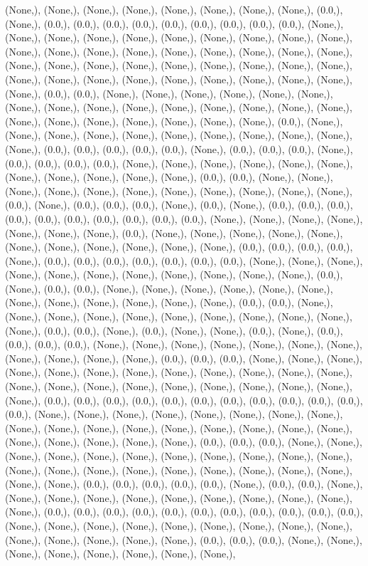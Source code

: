 \documentclass{article}
\begin{document}
(None,), (None,), (None,), (None,), (None,), (None,), (None,), (None,), (0.0,), (None,), (0.0,), (0.0,), (0.0,), (0.0,), (0.0,), (0.0,), (0.0,), (0.0,), (0.0,), (None,), (None,), (None,), (None,), (None,), (None,), (None,), (None,), (None,), (None,), (None,), (None,), (None,), (None,), (None,), (None,), (None,), (None,), (None,), (None,), (None,), (None,), (None,), (None,), (None,), (None,), (None,), (None,), (None,), (None,), (None,), (None,), (None,), (None,), (None,), (None,), (None,), (None,), (0.0,), (0.0,), (None,), (None,), (None,), (None,), (None,), (None,), (None,), (None,), (None,), (None,), (None,), (None,), (None,), (None,), (None,), (None,), (None,), (None,), (None,), (None,), (None,), (None,), (0.0,), (None,), (None,), (None,), (None,), (None,), (None,), (None,), (None,), (None,), (None,), (None,), (0.0,), (0.0,), (0.0,), (0.0,), (0.0,), (None,), (0.0,), (0.0,), (0.0,), (None,), (0.0,), (0.0,), (0.0,), (0.0,), (None,), (None,), (None,), (None,), (None,), (None,), (None,), (None,), (None,), (None,), (None,), (0.0,), (0.0,), (None,), (None,), (None,), (None,), (None,), (None,), (None,), (None,), (None,), (None,), (None,), (0.0,), (None,), (0.0,), (0.0,), (0.0,), (None,), (0.0,), (None,), (0.0,), (0.0,), (0.0,), (0.0,), (0.0,), (0.0,), (0.0,), (0.0,), (0.0,), (0.0,), (None,), (None,), (None,), (None,), (None,), (None,), (None,), (0.0,), (None,), (None,), (None,), (None,), (None,), (None,), (None,), (None,), (None,), (None,), (None,), (0.0,), (0.0,), (0.0,), (0.0,), (None,), (0.0,), (0.0,), (0.0,), (0.0,), (0.0,), (0.0,), (0.0,), (None,), (None,), (None,), (None,), (None,), (None,), (None,), (None,), (None,), (None,), (None,), (0.0,), (None,), (0.0,), (0.0,), (None,), (None,), (None,), (None,), (None,), (None,), (None,), (None,), (None,), (None,), (None,), (None,), (0.0,), (0.0,), (None,), (None,), (None,), (None,), (None,), (None,), (None,), (None,), (None,), (None,), (None,), (0.0,), (0.0,), (None,), (0.0,), (None,), (None,), (0.0,), (None,), (0.0,), (0.0,), (0.0,), (0.0,), (None,), (None,), (None,), (None,), (None,), (None,), (None,), (None,), (None,), (None,), (None,), (0.0,), (0.0,), (0.0,), (None,), (None,), (None,), (None,), (None,), (None,), (None,), (None,), (None,), (None,), (None,), (None,), (None,), (None,), (None,), (None,), (None,), (None,), (None,), (None,), (None,), (None,), (0.0,), (0.0,), (0.0,), (0.0,), (0.0,), (0.0,), (0.0,), (0.0,), (0.0,), (0.0,), (0.0,), (0.0,), (None,), (None,), (None,), (None,), (None,), (None,), (None,), (None,), (None,), (None,), (None,), (None,), (None,), (None,), (None,), (None,), (None,), (None,), (None,), (None,), (None,), (None,), (0.0,), (0.0,), (0.0,), (None,), (None,), (None,), (None,), (None,), (None,), (None,), (None,), (None,), (None,), (None,), (None,), (None,), (None,), (None,), (None,), (None,), (None,), (None,), (None,), (None,), (None,), (0.0,), (0.0,), (0.0,), (0.0,), (0.0,), (None,), (0.0,), (0.0,), (None,), (None,), (None,), (None,), (None,), (None,), (None,), (None,), (None,), (None,), (None,), (0.0,), (0.0,), (0.0,), (0.0,), (0.0,), (0.0,), (0.0,), (0.0,), (0.0,), (0.0,), (0.0,), (None,), (None,), (None,), (None,), (None,), (None,), (None,), (None,), (None,), (None,), (None,), (None,), (None,), (None,), (0.0,), (0.0,), (0.0,), (None,), (None,), (None,), (None,), (None,), (None,), (None,), (None,), 
\end{document}
